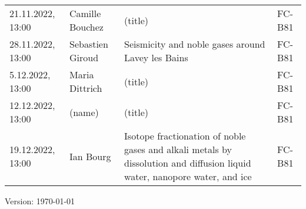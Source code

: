 \documentclass[12pt]{article}
\begin{document}
\begin{tabular}{l p{3.8cm} p{8.5cm} p{2cm}}
21.11.2022, 13:00
 	& Camille Bouchez
 	& (title)
 	& FC-B81\\

28.11.2022, 13:00
 	& Sebastien Giroud
 	& Seismicity and noble gases around Lavey les Bains
 	& FC-B81\\

5.12.2022, 13:00
 	& Maria Dittrich
 	& (title)
 	& FC-B81\\

12.12.2022, 13:00
 	& (name)
 	& (title)
 	& FC-B81\\

19.12.2022, 13:00
 	& Ian Bourg
 	& Isotope fractionation of noble gases and alkali metals by dissolution and diffusion liquid water, nanopore water, and ice
 	& FC-B81\\


\end{tabular}

\vfill

{\scriptsize Version: \today}
\end{document}
